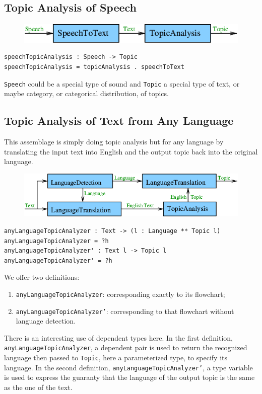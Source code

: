 \documentclass[]{article}
\begin{document}
\subsection{Topic Analysis of Speech}
\begin{figure}[H]
  \centering
  \includegraphics[scale=0.55]{figs/SpeechTopicAnalysis.png}
\end{figure}
\begin{verbatim}
speechTopicAnalysis : Speech -> Topic
speechTopicAnalysis = topicAnalysis . speechToText
\end{verbatim}
\texttt{Speech} could be a special type of sound and \texttt{Topic} a
special type of text, or maybe category, or categorical distribution,
of topics.

\subsection{Topic Analysis of Text from Any Language}
This assemblage is simply doing topic analysis but for any language by
translating the input text into English and the output topic back into
the original language.
\begin{figure}[H]
  \centering
  \includegraphics[scale=0.55]{figs/AnyLanguageTopicAnalysis.png}
\end{figure}
\begin{verbatim}
anyLanguageTopicAnalyzer : Text -> (l : Language ** Topic l)
anyLanguageTopicAnalyzer = ?h
anyLanguageTopicAnalyzer' : Text l -> Topic l
anyLanguageTopicAnalyzer' = ?h
\end{verbatim}
We offer two definitions:
\begin{enumerate}
\item \texttt{anyLanguageTopicAnalyzer}: corresponding exactly to its
  flowchart;
\item \texttt{anyLanguageTopicAnalyzer'}: corresponding to that
  flowchart without language detection.
\end{enumerate}
There is an interesting use of dependent types here.  In the first
definition, \texttt{anyLanguageTopicAnalyzer}, a dependent pair is
used to return the recognized language then passed to \texttt{Topic},
here a parameterized type, to specify its language.  In the second
definition, \texttt{anyLanguageTopicAnalyzer'}, a type variable is
used to express the guaranty that the language of the output topic is
the same as the one of the text.
\end{document}
